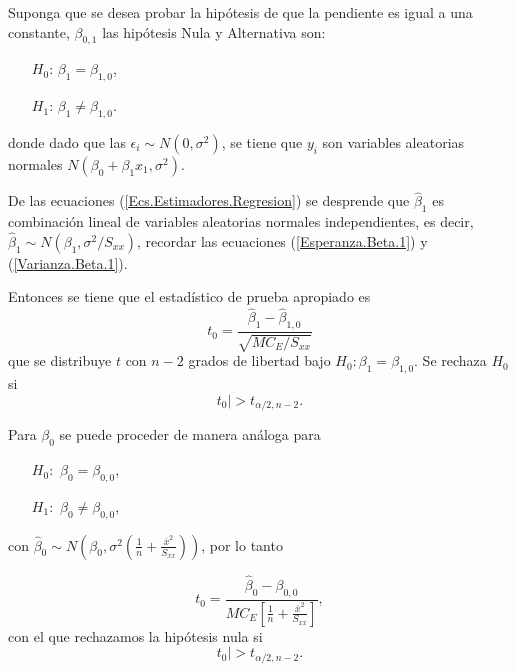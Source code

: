 \begin{itemize}
\begin{enumerate}
Suponga que se desea probar la hip\'otesis de que la pendiente es igual a una constante, $\beta_{0,1}$ las hip\'otesis Nula y Alternativa son:

\begin{centering}
\begin{itemize}
\item[$H_{0}$: ] $\beta_{1}=\beta_{1,0}$,

\item[$H_{1}$: ]$\beta_{1}\neq\beta_{1,0}$.

\end{itemize}
donde dado que las $\epsilon_{i} \sim N\left(0,\sigma^{2}\right)$, se tiene que $y_{i}$ son variables aleatorias normales $N\left(\beta_{0}+\beta_{1}x_{1},\sigma^{2}\right)$. 
\end{centering}

De las ecuaciones (\ref{Ecs.Estimadores.Regresion}) se desprende que $\hat{\beta}_{1}$ es combinaci\'on lineal de variables aleatorias normales independientes, es decir, $\hat{\beta}_{1}\sim N\left(\beta_{1},\sigma^{2}/S_{xx}\right)$, recordar las ecuaciones (\ref{Esperanza.Beta.1}) y (\ref{Varianza.Beta.1}).

Entonces se tiene que el estad\'istico de prueba apropiado es
\begin{equation}\label{Estadistico.Beta.1}
t_{0}=\frac{\hat{\beta}_{1}-\hat{\beta}_{1,0}}{\sqrt{MC_{E}/S_{xx}}}
\end{equation}
que se distribuye $t$ con $n-2$ grados de libertad bajo $H_{0}:\beta_{1}=\beta_{1,0}$. Se rechaza $H_{0}$ si 
\begin{equation}\label{Zona.Rechazo.Beta.1}
t_{0}|>t_{\alpha/2,n-2}.
\end{equation}

Para $\beta_{0}$ se puede proceder de manera an\'aloga para
\begin{itemize}
\item[$H_{0}:$] $\beta_{0}=\beta_{0,0}$,
\item[$H_{1}:$] $\beta_{0}\neq\beta_{0,0}$,
\end{itemize}
con $\hat{\beta}_{0}\sim N\left(\beta_{0},\sigma^{2}\left(\frac{1}{n}+\frac{\overline{x}^{2}}{S_{xx}}\right)\right)$, por lo tanto

\begin{equation}\label{Estadistico.Beta.0}
t_{0}=\frac{\hat{\beta}_{0}-\beta_{0,0}}{MC_{E}\left[\frac{1}{n}+\frac{\overline{x}^{2}}{S_{xx}}\right]},
\end{equation}
con el que rechazamos la hip\'otesis nula si
\begin{equation}\label{Zona.Rechazo.Beta.0}
t_{0}|>t_{\alpha/2,n-2}.
\end{equation}


\end{enumerate}
\end{itemize}
